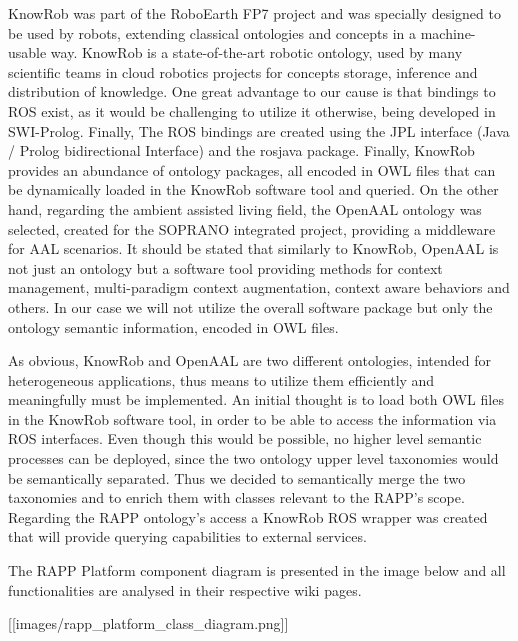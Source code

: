 Know\-Rob was part of the Robo\-Earth F\-P7 project and was specially designed to be used by robots, extending classical ontologies and concepts in a machine-\/usable way. Know\-Rob is a state-\/of-\/the-\/art robotic ontology, used by many scientific teams in cloud robotics projects for concepts storage, inference and distribution of knowledge. One great advantage to our cause is that bindings to R\-O\-S exist, as it would be challenging to utilize it otherwise, being developed in S\-W\-I-\/\-Prolog. Finally, The R\-O\-S bindings are created using the J\-P\-L interface (Java / Prolog bidirectional Interface) and the rosjava package. Finally, Know\-Rob provides an abundance of ontology packages, all encoded in O\-W\-L files that can be dynamically loaded in the Know\-Rob software tool and queried. On the other hand, regarding the ambient assisted living field, the Open\-A\-A\-L ontology was selected, created for the S\-O\-P\-R\-A\-N\-O integrated project, providing a middleware for A\-A\-L scenarios. It should be stated that similarly to Know\-Rob, Open\-A\-A\-L is not just an ontology but a software tool providing methods for context management, multi-\/paradigm context augmentation, context aware behaviors and others. In our case we will not utilize the overall software package but only the ontology semantic information, encoded in O\-W\-L files.

As obvious, Know\-Rob and Open\-A\-A\-L are two different ontologies, intended for heterogeneous applications, thus means to utilize them efficiently and meaningfully must be implemented. An initial thought is to load both O\-W\-L files in the Know\-Rob software tool, in order to be able to access the information via R\-O\-S interfaces. Even though this would be possible, no higher level semantic processes can be deployed, since the two ontology upper level taxonomies would be semantically separated. Thus we decided to semantically merge the two taxonomies and to enrich them with classes relevant to the R\-A\-P\-P’s scope. Regarding the R\-A\-P\-P ontology’s access a Know\-Rob R\-O\-S wrapper was created that will provide querying capabilities to external services.

The R\-A\-P\-P Platform component diagram is presented in the image below and all functionalities are analysed in their respective wiki pages.

\mbox{[}\mbox{[}images/rapp\-\_\-platform\-\_\-class\-\_\-diagram.\-png\mbox{]}\mbox{]} 